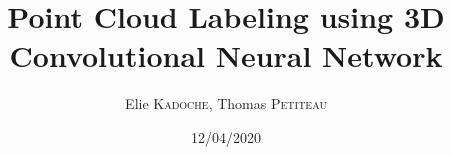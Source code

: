 \documentclass{article}
\title{Point Cloud Labeling using 3D Convolutional Neural Network}
\author{Elie \textsc{Kadoche}, Thomas \textsc{Petiteau}}
\date{12/04/2020}
\begin{document}
\maketitle









\printglossaries
\printbibliography
\end{document}
